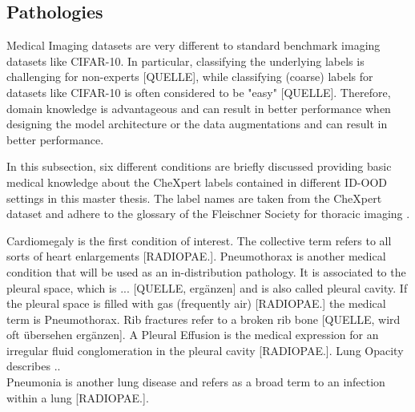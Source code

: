 \subsection{Pathologies}
Medical Imaging datasets are very different to standard benchmark imaging datasets like CIFAR-10.
In particular, classifying the underlying labels is challenging for non-experts [QUELLE], while classifying (coarse) labels for datasets like CIFAR-10 is often considered to be "easy" [QUELLE].
Therefore, domain knowledge is advantageous and can result in better performance when designing the model architecture or the data augmentations and can result in better performance.
\par
In this subsection, six different conditions are briefly discussed providing basic medical knowledge about the CheXpert labels contained in different ID-OOD settings in this master thesis.
The label names are taken from the CheXpert dataset \citep{Irvin2019} and adhere to the glossary of the Fleischner Society for thoracic imaging \citep{Hansell2008}.
\par
Cardiomegaly is the first condition of interest. The collective term refers to all sorts of heart enlargements [RADIOPAE.].
Pneumothorax is another medical condition that will be used as an in-distribution pathology.
It is associated to the pleural space, which is ... [QUELLE, ergänzen] and is also called pleural cavity.
If the pleural space is filled with gas (frequently air) [RADIOPAE.] the medical term is Pneumothorax.
Rib fractures refer to a broken rib bone [QUELLE, wird oft übersehen ergänzen].
A Pleural Effusion is the medical expression for an irregular fluid conglomeration in the pleural cavity [RADIOPAE.].
Lung Opacity describes .. \\
Pneumonia is another lung disease and refers as a broad term to an infection within a lung [RADIOPAE.]. 

